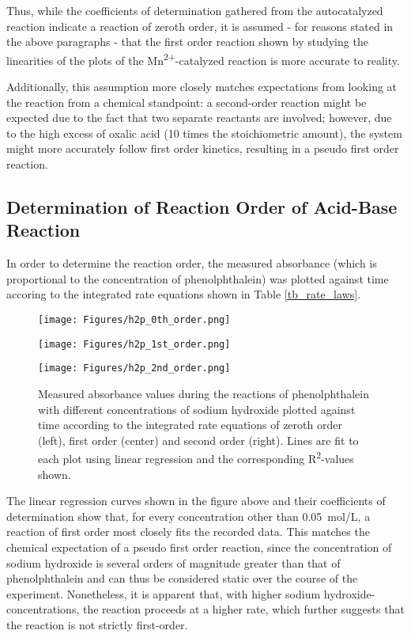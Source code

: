 \documentclass[titlepage]{article}
\begin{document}
Thus, while the coefficients of determination gathered from the autocatalyzed reaction indicate a reaction of zeroth order, it is assumed - for reasons stated in the above paragraphs - that the first order reaction shown by studying the linearities of the plots of the Mn\textsuperscript{2+}-catalyzed reaction is more accurate to reality.

Additionally, this assumption more closely matches expectations from looking at the reaction from a chemical standpoint: a second-order reaction might be expected due to the fact that two separate reactants are involved; however, due to the high excess of oxalic acid (10 times the stoichiometric amount), the system might more accurately follow first order kinetics, resulting in a pseudo first order reaction.

\newpage
\subsection{Determination of Reaction Order of Acid-Base Reaction}
In order to determine the reaction order, the measured absorbance (which is proportional to the concentration of phenolphthalein) was plotted against time accoring to the integrated rate equations shown in Table \ref{tb_rate_laws}.

\begin{figure}[H]
    \centering
    \begin{minipage}[c]{0.32\textwidth}
        \texttt{[image: Figures/h2p\_0th\_order.png]}
    \end{minipage}
    \begin{minipage}[c]{0.32\textwidth}
        \texttt{[image: Figures/h2p\_1st\_order.png]}
    \end{minipage}
    \begin{minipage}[c]{0.32\textwidth}
        \texttt{[image: Figures/h2p\_2nd\_order.png]}
    \end{minipage}
    \caption{Measured absorbance values during the reactions of phenolphthalein with different concentrations of sodium hydroxide plotted against time according to the integrated rate equations of zeroth order (left), first order (center) and second order (right). Lines are fit to each plot using linear regression and the corresponding R\textsuperscript{2}-values shown.}
    \label{fig_h2p_rates}
\end{figure}
%
\noindent The linear regression curves shown in the figure above and their coefficients of determination show that, for every concentration other than 0.05~mol/L, a reaction of first order most closely fits the recorded data. This matches the chemical expectation of a pseudo first order reaction, since the concentration of sodium hydroxide is several orders of magnitude greater than that of phenolphthalein and can thus be considered static over the course of the experiment. Nonetheless, it is apparent that, with higher sodium hydroxide-concentrations, the reaction proceeds at a higher rate, which further suggests that the reaction is not strictly first-order.
\end{document}
